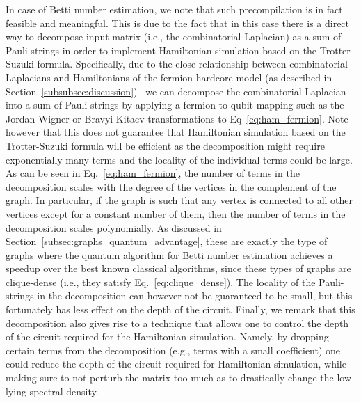 \documentclass[a4paper, onecolumn, accepted=2022-08-28]{quantumarticle}
\begin{document}
In case of Betti number estimation, we note that such precompilation is in fact feasible and meaningful.
This is due to the fact that in this case there is a direct way to decompose input matrix (i.e., the combinatorial Laplacian) as a sum of Pauli-strings in order to implement Hamiltonian simulation based on the Trotter-Suzuki formula.
Specifically, due to the close relationship between combinatorial Laplacians and Hamiltonians of the fermion hardcore model (as described in Section~\ref{subsubsec:discussion})~\cite{cade:complexity} we can decompose the combinatorial Laplacian into a sum of Pauli-strings by applying a fermion to qubit mapping such as the Jordan-Wigner or Bravyi-Kitaev transformations to Eq~\eqref{eq:ham_fermion}. 
Note however that this does not guarantee that Hamiltonian simulation based on the Trotter-Suzuki formula will be efficient as the decomposition might require exponentially many terms and the locality of the individual terms could be large.
As can be seen in Eq.~\eqref{eq:ham_fermion}, the number of terms in the decomposition scales with the degree of the vertices in the complement of the graph.
In particular, if the graph is such that any vertex is connected to all other vertices except for a constant number of them, then the number of terms in the decomposition scales polynomially.
As discussed in Section~\ref{subsec:graphs_quantum_advantage}, these are exactly the type of graphs where the quantum algorithm for Betti number estimation achieves a speedup over the best known classical algorithms, since these types of graphs are clique-dense (i.e., they satisfy Eq.~\eqref{eq:clique_dense}).
The locality of the Pauli-strings in the decomposition can however not be guaranteed to be small, but this fortunately has less effect on the depth of the circuit.
Finally, we remark that this decomposition also gives rise to a technique that allows one to control the depth of the circuit required for the Hamiltonian simulation.
Namely, by dropping certain terms from the decomposition (e.g., terms with a small coefficient) one could reduce the depth of the circuit required for Hamiltonian simulation, while making sure to not perturb the matrix too much as to drastically change the low-lying spectral density.
\end{document}
